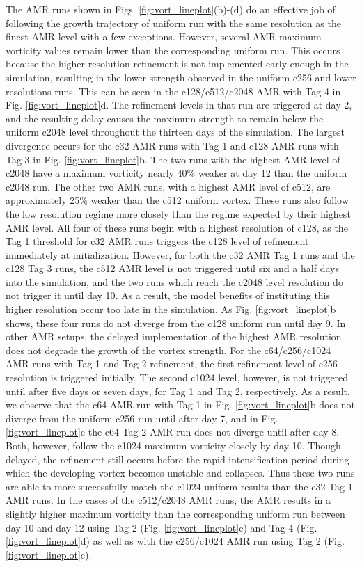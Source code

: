 The AMR runs shown in Figs. \ref{fig:vort_lineplot}(b)-(d) do an 
effective job of following the growth trajectory of uniform run with the same resolution as 
the finest AMR level with a few exceptions. 
However, several AMR maximum vorticity values remain lower than the corresponding uniform run.
This occurs because the higher resolution refinement is not implemented early enough in the simulation,
resulting in the lower strength observed in the uniform c256 and lower resolutions runs.
This can be seen in the c128/c512/c2048 AMR with Tag 4 in Fig. \ref{fig:vort_lineplot}d.
The refinement levels in that run are triggered at day 2, and the resulting delay
causes the maximum strength to remain below the uniform c2048 level throughout
the thirteen days of the simulation. The largest divergence occurs for the c32 AMR runs
with Tag 1 and c128 AMR runs with Tag 3 in Fig. \ref{fig:vort_lineplot}b. 
The two runs with the highest AMR level of c2048 have a maximum vorticity
nearly 40\% weaker at day 12 than the uniform c2048 run. The other two AMR runs, with a highest
AMR level of c512, are approximately 25\% weaker than the c512 uniform vortex. These runs also 
follow the low resolution regime more closely than the regime expected by their highest AMR level. 
All four of these runs begin with a highest resolution of c128, as the Tag 1 threshold for c32 AMR runs 
triggers the c128 level of refinement immediately at initialization.  However, for both the c32 AMR Tag 1 runs
and the c128 Tag 3 runs, the c512 AMR level is not triggered until six and a half days into the simulation,
and the two runs which reach the c2048 level resolution do not trigger it until day 10. As a result, the model benefits
of instituting this higher resolution occur too late in the simulation. As Fig. \ref{fig:vort_lineplot}b shows, these four
runs do not diverge from the c128 uniform run until
day 9. In other AMR setups, the delayed implementation of
the highest AMR resolution does not degrade the growth 
of the vortex strength. For the c64/c256/c1024 AMR 
runs with Tag 1 and Tag 2 refinement, the first refinement 
level of c256 resolution is triggered initially.
The second c1024 level, however, is not triggered until 
after five days or seven days, for Tag 1 and Tag 2, respectively.  
As a result, we observe that the c64 AMR run with Tag 1 in 
Fig. \ref{fig:vort_lineplot}b does not diverge from the uniform c256
run until after day 7, and in Fig. \ref{fig:vort_lineplot}c 
the c64 Tag 2 AMR run does not diverge until after day 8.
Both, however, follow the c1024 maximum vorticity closely by day 10.
Though delayed, the refinement still occurs before the rapid intensification period during which
the developing vortex becomes unstable and collapses. 
Thus these two runs are able to more successfully
match the c1024 uniform results than the c32 Tag 1 AMR 
runs. In the cases of the c512/c2048 AMR runs, the AMR results in a 
slightly higher maximum vorticity than the corresponding 
uniform run between day 10 and day 12 using 
Tag 2 (Fig. \ref{fig:vort_lineplot}c) and Tag 4 (Fig. \ref{fig:vort_lineplot}d)  
as well as with the c256/c1024 AMR run using Tag 2 (Fig. \ref{fig:vort_lineplot}c).

